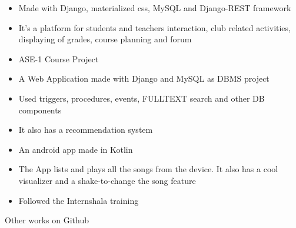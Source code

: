 \documentclass[10pt,a4paper]{altacv}
\begin{document}
\divider




\begin{itemize}
  \item \small{Made with Django, materialized css, MySQL and Django-REST framework}
  \item It's a platform for students and teachers interaction, club related activities, displaying of grades, course planning and forum
  \item ASE-1 Course Project
\end{itemize}

\divider

%



\begin{itemize}
  \item \small{ A Web Application made with Django and MySQL as DBMS project}
  \item Used triggers, procedures, events, FULLTEXT search and other DB components
  \item It also has a recommendation system
\end{itemize}

\divider



\begin{itemize}
  \item \small{An android app made in Kotlin}
  \item The App lists and plays all the songs from the device. It also has a cool visualizer and a shake-to-change the song feature
  \item Followed the Internshala training
\end{itemize}

\divider

Other works on Github
\end{document}
